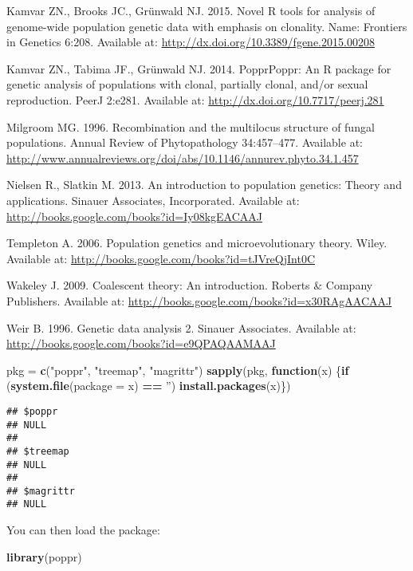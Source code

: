\documentclass[12pt,]{krantz}
\newenvironment{Shaded}{\begin{snugshade}}{\end{snugshade}}
\newcommand{\KeywordTok}[1]{\textcolor[rgb]{0.27,0.27,0.27}{\textbf{#1}}}
\newcommand{\DataTypeTok}[1]{\textcolor[rgb]{0.27,0.27,0.27}{#1}}
\newcommand{\StringTok}[1]{\textcolor[rgb]{0.5,0.5,0.5}{#1}}
\newcommand{\ControlFlowTok}[1]{\textcolor[rgb]{0.13,0.29,0.53}{\textbf{#1}}}
\newcommand{\OperatorTok}[1]{\textcolor[rgb]{0.81,0.36,0.00}{\textbf{#1}}}
\newcommand{\NormalTok}[1]{#1}
\theoremstyle{definition}
\theoremstyle{definition}
\theoremstyle{definition}
\theoremstyle{remark}
\begin{document}
Kamvar ZN., Brooks JC., Grünwald NJ. 2015. Novel R tools for analysis of
genome-wide population genetic data with emphasis on clonality. Name:
Frontiers in Genetics 6:208. Available at:
\url{http://dx.doi.org/10.3389/fgene.2015.00208}

Kamvar ZN., Tabima JF., Grünwald NJ. 2014. PopprPoppr: An R package for
genetic analysis of populations with clonal, partially clonal, and/or
sexual reproduction. PeerJ 2:e281. Available at:
\url{http://dx.doi.org/10.7717/peerj.281}

Milgroom MG. 1996. Recombination and the multilocus structure of fungal
populations. Annual Review of Phytopathology 34:457--477. Available at:
\url{http://www.annualreviews.org/doi/abs/10.1146/annurev.phyto.34.1.457}

Nielsen R., Slatkin M. 2013. An introduction to population genetics:
Theory and applications. Sinauer Associates, Incorporated. Available at:
\url{http://books.google.com/books?id=Iy08kgEACAAJ}

Templeton A. 2006. Population genetics and microevolutionary theory.
Wiley. Available at: \url{http://books.google.com/books?id=tJVreQjInt0C}

Wakeley J. 2009. Coalescent theory: An introduction. Roberts \& Company
Publishers. Available at:
\url{http://books.google.com/books?id=x30RAgAACAAJ}

Weir B. 1996. Genetic data analysis 2. Sinauer Associates. Available at:
\url{http://books.google.com/books?id=e9QPAQAAMAAJ}

\begin{Shaded}
\begin{Highlighting}[]
\NormalTok{pkg =}\StringTok{ }\KeywordTok{c}\NormalTok{(}\StringTok{"poppr"}\NormalTok{, }\StringTok{"treemap"}\NormalTok{, }\StringTok{"magrittr"}\NormalTok{)}
\KeywordTok{sapply}\NormalTok{(pkg, }\ControlFlowTok{function}\NormalTok{(x) \{}\ControlFlowTok{if}\NormalTok{ (}\KeywordTok{system.file}\NormalTok{(}\DataTypeTok{package =}\NormalTok{ x) }\OperatorTok{==}\StringTok{ ''}\NormalTok{) }\KeywordTok{install.packages}\NormalTok{(x)\})}
\end{Highlighting}
\end{Shaded}

\begin{verbatim}
## $poppr
## NULL
## 
## $treemap
## NULL
## 
## $magrittr
## NULL
\end{verbatim}

You can then load the package:

\begin{Shaded}
\begin{Highlighting}[]
\KeywordTok{library}\NormalTok{(poppr)}
\end{Highlighting}
\end{Shaded}
\end{document}
